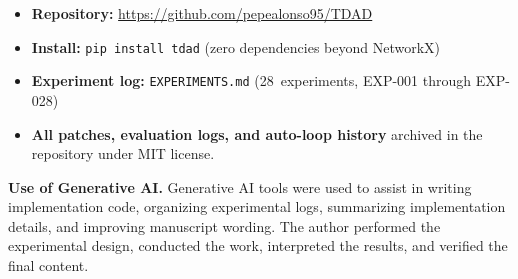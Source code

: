 \documentclass[sigconf,nonacm]{acmart}
\begin{document}
\begin{itemize}
  \item \textbf{Repository:}
    \url{https://github.com/pepealonso95/TDAD}
  \item \textbf{Install:} \texttt{pip install tdad} (zero dependencies beyond
    NetworkX)
  \item \textbf{Experiment log:} \texttt{EXPERIMENTS.md}
    (28~experiments, EXP-001 through EXP-028)
  \item \textbf{All patches, evaluation logs, and auto-loop history} archived
    in the repository under MIT license.
\end{itemize}

\smallskip
\noindent\textbf{Use of Generative AI.}\enspace
Generative AI tools were used to assist in writing implementation code,
organizing experimental logs, summarizing implementation details, and
improving manuscript wording.  The author performed the experimental design,
conducted the work, interpreted the results, and verified the final content.

\balance
\end{document}
